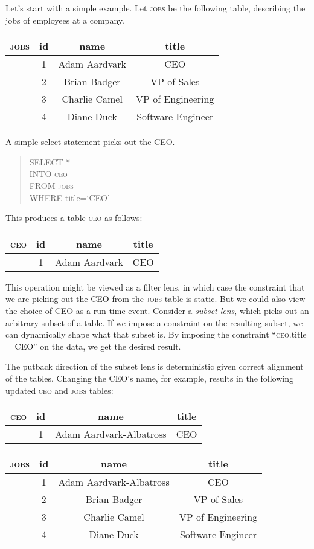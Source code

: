 \documentclass{article}
\begin{document}
Let's start with a simple example.
Let \textsc{jobs} be the following table, describing the jobs of employees
at a company.
\begin{center} \begin{tabular} {c | c c c}
    \textsc{jobs} & id & name & title \\
    \hline
    & 1 & Adam Aardvark & CEO \\
    & 2 & Brian Badger & VP of Sales \\
    & 3 & Charlie Camel & VP of Engineering \\
    & 4 & Diane Duck & Software Engineer
\end{tabular} \end{center}
A simple select statement picks out the CEO.
\begin{quote}
    SELECT * \\
    INTO \textsc{ceo} \\
    FROM \textsc{jobs} \\
    WHERE title=`CEO'
\end{quote}
This produces a table \textsc{ceo} as follows:
\begin{center} \begin{tabular} {c | c c c}
    \textsc{ceo} & id & name & title \\
    \hline
    & 1 & Adam Aardvark & CEO
\end{tabular} \end{center}
This operation might be viewed as a filter lens, in which
case the constraint that we are picking out the CEO from the
\textsc{jobs} table is static. 
But we could also view the choice of CEO as a run-time event.
Consider a \emph{subset lens}, which picks out an arbitrary subset of 
a table. If we impose a constraint on the resulting subset, we
can dynamically shape what that subset is. By imposing the constraint
``\textsc{ceo}.title = CEO'' on the data, we get the desired result.

The putback direction of the subset lens is deterministic given correct alignment
of the tables.
Changing the CEO's name, for example, results in the following updated
\textsc{ceo} and \textsc{jobs} tables:
\begin{center} \begin{tabular} {c | c c c}
    \textsc{ceo} & id & name & title\\
    \hline
    & 1 & Adam Aardvark-Albatross & CEO
\end{tabular} \end{center}
\begin{center} \begin{tabular} {c | c c c}
    \textsc{jobs} & id & name & title \\
    \hline
    & 1 & Adam Aardvark-Albatross & CEO \\
    & 2 & Brian Badger & VP of Sales \\
    & 3 & Charlie Camel & VP of Engineering \\
    & 4 & Diane Duck & Software Engineer
\end{tabular} \end{center}
\end{document}
